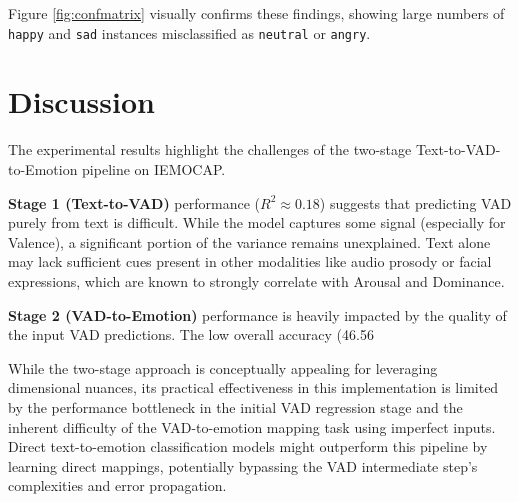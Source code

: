 \documentclass[conference]{IEEEtran}
\begin{document}
Figure \ref{fig:confmatrix} visually confirms these findings, showing large numbers of \texttt{happy} and \texttt{sad} instances misclassified as \texttt{neutral} or \texttt{angry}.

\section{Discussion}
The experimental results highlight the challenges of the two-stage Text-to-VAD-to-Emotion pipeline on IEMOCAP.

\textbf{Stage 1 (Text-to-VAD)} performance ($R^2 \approx 0.18$) suggests that predicting VAD purely from text is difficult. While the model captures some signal (especially for Valence), a significant portion of the variance remains unexplained. Text alone may lack sufficient cues present in other modalities like audio prosody or facial expressions, which are known to strongly correlate with Arousal and Dominance.

\textbf{Stage 2 (VAD-to-Emotion)} performance is heavily impacted by the quality of the input VAD predictions. The low overall accuracy (46.56%

While the two-stage approach is conceptually appealing for leveraging dimensional nuances, its practical effectiveness in this implementation is limited by the performance bottleneck in the initial VAD regression stage and the inherent difficulty of the VAD-to-emotion mapping task using imperfect inputs. Direct text-to-emotion classification models might outperform this pipeline by learning direct mappings, potentially bypassing the VAD intermediate step's complexities and error propagation.
\end{document}
